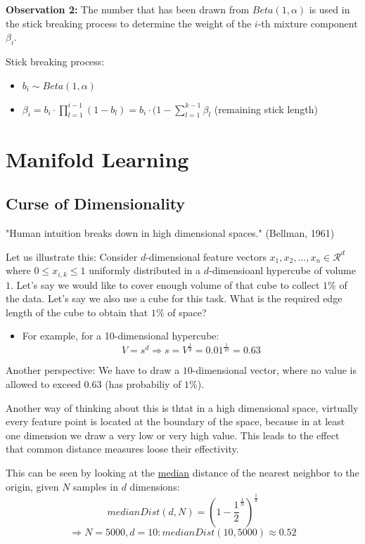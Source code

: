 \documentclass{scrartcl}
\begin{document}
\textbf{Observation 2:} The number that has been drawn from \(Beta(1,\alpha)\) is used in the stick breaking process to determine the weight of the \(i\)-th mixture component \(\beta_i\).

Stick breaking process:
\begin{itemize}
    \item
        \(b_i \sim Beta(1, \alpha)\)
    \item
        \(\beta_i = b_i \cdot \prod_{l=1}^{i-1} (1-b_l) = b_i \cdot (1-\sum_{l=1}^{k-1} \beta_l\) (remaining stick length)
\end{itemize}

\section{Manifold Learning}
\subsection{Curse of Dimensionality}
"Human intuition breaks down in high dimensional spaces." (Bellman, 1961)

Let us illustrate this: Consider \(d\)-dimensional feature vectors \(x_1, x_2, \dots, x_n \in \mathcal{R}^d\) where \(0 \leq x_{i,k} \leq 1\) uniformly distributed in a \(d\)-dimensioanl hypercube of volume \(1\). Let's say we would like to cover enough volume of that cube to collect \(1\%\) of the data. Let's say we also use a cube for this task. What is the required edge length of the cube to obtain that \(1\%\) of space?
\begin{itemize}
    \item
        For example, for a 10-dimensional hypercube: 
        \[V = s^d \Rightarrow s = V^{\frac{1}{d}} = 0.01^{\frac{1}{10}} = 0.63\] 
\end{itemize}
Another perspective: We have to draw a \(10\)-dimensional vector, where no value is allowed to exceed \(0.63\) (has probabiliy of \(1\%\)).

Another way of thinking about this is thtat in a high dimensional space, virtually every feature point is located at the boundary of the space, because in at least one dimension we draw a very low or very high value. This leads to the effect that common distance measures loose their effectivity.

This can be seen by looking at the \underline{median} distance of the nearest neighbor to the origin, given \(N\) samples in \(d\) dimensions:
\[medianDist(d, N) = (1 - \frac{1}{2}^{\frac{1}{N}})^{\frac{1}{d}}\]
\[\Rightarrow N=5000, d=10: medianDist(10, 5000) \approx 0.52\]
\end{document}
